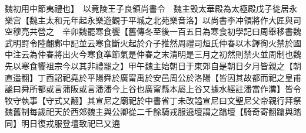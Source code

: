 魏初用中節夷禮也】　以竟陵王子良領尚書令　魏主毁太華殿為太極殿戊子徙居永樂宫【魏主太和元年起永樂遊觀于平城之北苑樂音洛】以尚書李冲領將作大匠與司空穆亮共營之　辛卯魏罷寒食饗【舊傳冬至後一百五日為寒食初學記曰周舉移書魏武明罸令陸翽鄴中記並云寒食斷火起於介子推然周禮司烜氏仲春以木鐸徇火禁於國中注云為仲春將出火今寒食凖節氣是仲春之末清明是三月之初然則禁火並周制也魏先以寒食饗祖宗今以其非禮罷之】甲午魏主始朝日于東郊自是朝日夕月皆親之【朝直遥翻】丁酉詔祀堯於平陽舜於廣甯禹於安邑周公於洛陽【皆因其故都而祀之皇甫謐曰舜所都或言蒲阪或言潘潘今上谷也廣甯縣本屬上谷又據水經註潘當作瀵】皆令牧守執事【守式又翻】其宣尼之廟祀於中書省丁未改謚宣尼曰文聖尼父帝親行拜祭魏舊制每歲祀天於西郊魏主與公卿從二千餘騎戎服遶壇謂之蹹壇【騎奇寄翻蹹與踏同】明日復戎服登壇致祀已又遶
